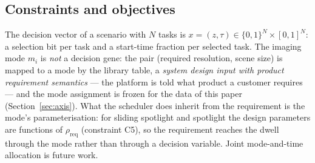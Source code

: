 \documentclass[preprint,authoryear]{elsarticle}
\begin{document}
\subsection{Constraints and objectives}\label{sec:constraints}

The decision vector of a scenario with $N$ tasks is $x=(z,\tau)\in\{0,1\}^{N}\times[0,1]^{N}$: a selection bit per task and a start-time fraction per selected task. The imaging mode $m_i$ is \emph{not} a decision gene: the pair (required resolution, scene size) is mapped to a mode by the library table, a \emph{system design input with product requirement semantics} --- the platform is told what product a customer requires --- and the mode assignment is frozen for the data of this paper (Section~\ref{sec:axis}). What the scheduler does inherit from the requirement is the mode's parameterisation: for sliding spotlight and spotlight the design parameters are functions of $\rho_{\mathrm{req}}$ (constraint C5), so the requirement reaches the dwell through the mode rather than through a decision variable. Joint mode-and-time allocation is future work.
\end{document}
